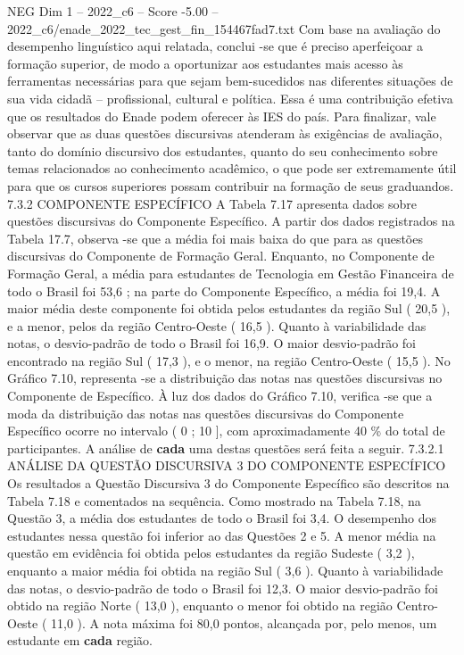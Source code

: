 \begin{textsample}{NEG Dim 1 – 2022\_c6 – Score -5.00 – 2022\_c6/enade\_2022\_tec\_gest\_fin\_154467fad7.txt}
Com base na avaliação do desempenho linguístico aqui relatada, conclui -se que é preciso aperfeiçoar a formação superior, de modo a oportunizar aos estudantes mais acesso às ferramentas necessárias para que sejam bem-sucedidos nas diferentes situações de sua vida cidadã – profissional, cultural e política.
Essa é uma contribuição efetiva que os resultados do Enade podem oferecer às IES do país.
Para finalizar, vale observar que as duas questões discursivas atenderam às exigências de avaliação, tanto do domínio discursivo dos estudantes, quanto do seu conhecimento sobre temas relacionados ao conhecimento acadêmico, o que pode ser extremamente útil para que os cursos superiores possam contribuir na formação de seus graduandos. 7.3.2 COMPONENTE ESPECÍFICO A Tabela 7.17 apresenta dados sobre questões discursivas do Componente Específico.
A partir dos dados registrados na Tabela 17.7, observa -se que a média foi mais baixa do que para as questões discursivas do Componente de Formação Geral.
Enquanto, no Componente de Formação Geral, a média para estudantes de Tecnologia em Gestão Financeira de todo o Brasil foi 53,6 ; na parte do Componente Específico, a média foi 19,4.
A maior média deste componente foi obtida pelos estudantes da região Sul ( 20,5 ), e a menor, pelos da região Centro-Oeste ( 16,5 ).
Quanto à variabilidade das notas, o desvio-padrão de todo o Brasil foi 16,9.
O maior desvio-padrão foi encontrado na região Sul ( 17,3 ), e o menor, na região Centro-Oeste ( 15,5 ).
No Gráfico 7.10, representa -se a distribuição das notas nas questões discursivas no Componente de Específico.
À luz dos dados do Gráfico 7.10, verifica -se que a moda da distribuição das notas nas questões discursivas do Componente Específico ocorre no intervalo ( 0 ; 10 ], com aproximadamente 40 \% do total de participantes.
A análise de \textbf{cada} uma destas questões será feita a seguir. 7.3.2.1 ANÁLISE DA QUESTÃO DISCURSIVA 3 DO COMPONENTE ESPECÍFICO Os resultados a Questão Discursiva 3 do Componente Específico são descritos na Tabela 7.18 e comentados na sequência.
Como mostrado na Tabela 7.18, na Questão 3, a média dos estudantes de todo o Brasil foi 3,4.
O desempenho dos estudantes nessa questão foi inferior ao das Questões 2 e 5.
A menor média na questão em evidência foi obtida pelos estudantes da região Sudeste ( 3,2 ), enquanto a maior média foi obtida na região Sul ( 3,6 ).
Quanto à variabilidade das notas, o desvio-padrão de todo o Brasil foi 12,3.
O maior desvio-padrão foi obtido na região Norte ( 13,0 ), enquanto o menor foi obtido na região Centro-Oeste ( 11,0 ).
A nota máxima foi 80,0 pontos, alcançada por, pelo menos, um estudante em \textbf{cada} região.

\end{textsample}
